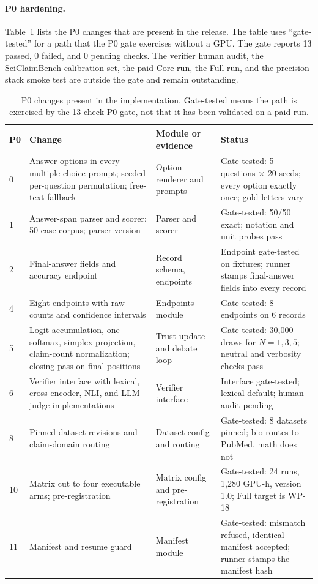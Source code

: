 \paragraph*{P0 hardening.}
Table~\ref{tab:p0-changes} lists the P0 changes that are present in the release. The table uses ``gate-tested'' for a path that the P0 gate exercises without a GPU. The gate reports 13 passed, 0 failed, and 0 pending checks. The verifier human audit, the SciClaimBench calibration set, the paid Core run, the Full run, and the precision-stack smoke test are outside the gate and remain outstanding.

\begin{table}[H]
  \centering
  \caption{P0 changes present in the implementation. Gate-tested means the path is exercised by the 13-check P0 gate, not that it has been validated on a paid run.}
  \renewcommand{\arraystretch}{1.25}
  \small
  \begin{tabular}{|p{}|p{}|p{}|p{}|}
    \hline
    P0 & Change & Module or evidence & Status \\
    \hline
    0 & Answer options in every multiple-choice prompt; seeded per-question permutation; free-text fallback & Option renderer and prompts & Gate-tested: 5 questions $\times$ 20 seeds; every option exactly once; gold letters vary \\
    \hline
    1 & Answer-span parser and scorer; 50-case corpus; parser version & Parser and scorer & Gate-tested: 50/50 exact; notation and unit probes pass \\
    \hline
    2 & Final-answer fields and accuracy endpoint & Record schema, endpoints & Endpoint gate-tested on fixtures; runner stamps final-answer fields into every record \\
    \hline
    4 & Eight endpoints with raw counts and confidence intervals & Endpoints module & Gate-tested: 8 endpoints on 6 records \\
    \hline
    5 & Logit accumulation, one softmax, simplex projection, claim-count normalization; closing pass on final positions & Trust update and debate loop & Gate-tested: 30,000 draws for $N=1,3,5$; neutral and verbosity checks pass \\
    \hline
    6 & Verifier interface with lexical, cross-encoder, NLI, and LLM-judge implementations & Verifier interface & Interface gate-tested; lexical default; human audit pending \\
    \hline
    8 & Pinned dataset revisions and claim-domain routing & Dataset config and routing & Gate-tested: 8 datasets pinned; bio routes to PubMed, math does not \\
    \hline
    10 & Matrix cut to four executable arms; pre-registration & Matrix config and pre-registration & Gate-tested: 24 runs, 1{,}280 GPU-h, version 1.0; Full target is WP-18 \\
    \hline
    11 & Manifest and resume guard & Manifest module & Gate-tested: mismatch refused, identical manifest accepted; runner stamps the manifest hash \\
    \hline
  \end{tabular}
  \label{tab:p0-changes}
\end{table}

